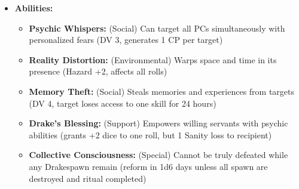 \documentclass[11pt]{article}
\begin{document}
\begin{itemize}
  \item \textbf{Abilities:}
    \begin{itemize}
    \item \textbf{Psychic Whispers:} (Social) Can target all PCs simultaneously with personalized fears (DV 3, generates 1 CP per target)
    \item \textbf{Reality Distortion:} (Environmental) Warps space and time in its presence (Hazard +2, affects all rolls)
    \item \textbf{Memory Theft:} (Social) Steals memories and experiences from targets (DV 4, target loses access to one skill for 24 hours)
    \item \textbf{Drake's Blessing:} (Support) Empowers willing servants with psychic abilities (grants +2 dice to one roll, but 1 Sanity loss to recipient)
    \item \textbf{Collective Consciousness:} (Special) Cannot be truly defeated while any Drakespawn remain (reform in 1d6 days unless all spawn are destroyed and ritual completed)
    \end{itemize}
\end{itemize}
\end{document}

